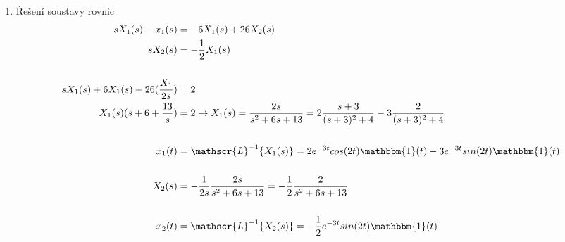\documentclass{article}
\newcommand{\Laplace}{\mathscr{L}}
\begin{document}
\begin{enumerate}
    \item Řešení soustavy rovnic
    \begin{align*}
        sX_1(s)-x_1(s) &= -6 X_1(s) + 26 X_2(s)\\
        sX_2(s) &= - \frac{1}{2}X_1(s)\\
        \\
        sX_1(s)+6X_1(s)+26(\frac{X_1}{2s}) &= 2\\
        X_1(s)(s+6+\frac{13}{s}) &= 2 \rightarrow X_1(s) = \frac{2s}{s^2+6s+13} = 2 \frac{s+3}{(s+3)^2+4}-3\frac{2}{(s+3)^2+4}\\
        \\
        x_1(t) &= \Laplace^{-1}\{ X_1(s) \} = 2e^{-3t} cos(2t)\mathbbm{1}(t) -3e^{-3t} sin(2t) \mathbbm{1}(t)\\
        \\
        X_2(s) &= -\frac{1}{2s}\frac{2s}{s^2+6s+13}=-\frac{1}{2}\frac{2}{s^2+6s+13}\\
        \\
        x_2(t) &= \Laplace^{-1}\{X_2(s)\} = -\frac{1}{2} e^{-3t} sin(2t)\mathbbm{1}(t)
    \end{align*}
    


\end{enumerate}
\end{document}
